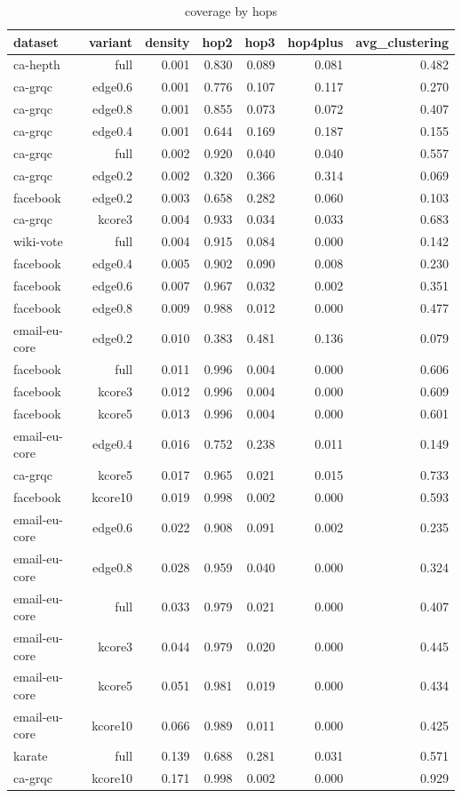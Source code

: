 \begin{table}[t]
\centering
\caption{coverage by hops}
\label{tab:coverage_by_hops}
\begin{tabular}{lrrrrrr}
\hline
dataset & variant & density & hop2 & hop3 & hop4plus & avg\_clustering \\
\hline
ca-hepth & full & 0.001 & 0.830 & 0.089 & 0.081 & 0.482 \\
ca-grqc & edge0.6 & 0.001 & 0.776 & 0.107 & 0.117 & 0.270 \\
ca-grqc & edge0.8 & 0.001 & 0.855 & 0.073 & 0.072 & 0.407 \\
ca-grqc & edge0.4 & 0.001 & 0.644 & 0.169 & 0.187 & 0.155 \\
ca-grqc & full & 0.002 & 0.920 & 0.040 & 0.040 & 0.557 \\
ca-grqc & edge0.2 & 0.002 & 0.320 & 0.366 & 0.314 & 0.069 \\
facebook & edge0.2 & 0.003 & 0.658 & 0.282 & 0.060 & 0.103 \\
ca-grqc & kcore3 & 0.004 & 0.933 & 0.034 & 0.033 & 0.683 \\
wiki-vote & full & 0.004 & 0.915 & 0.084 & 0.000 & 0.142 \\
facebook & edge0.4 & 0.005 & 0.902 & 0.090 & 0.008 & 0.230 \\
facebook & edge0.6 & 0.007 & 0.967 & 0.032 & 0.002 & 0.351 \\
facebook & edge0.8 & 0.009 & 0.988 & 0.012 & 0.000 & 0.477 \\
email-eu-core & edge0.2 & 0.010 & 0.383 & 0.481 & 0.136 & 0.079 \\
facebook & full & 0.011 & 0.996 & 0.004 & 0.000 & 0.606 \\
facebook & kcore3 & 0.012 & 0.996 & 0.004 & 0.000 & 0.609 \\
facebook & kcore5 & 0.013 & 0.996 & 0.004 & 0.000 & 0.601 \\
email-eu-core & edge0.4 & 0.016 & 0.752 & 0.238 & 0.011 & 0.149 \\
ca-grqc & kcore5 & 0.017 & 0.965 & 0.021 & 0.015 & 0.733 \\
facebook & kcore10 & 0.019 & 0.998 & 0.002 & 0.000 & 0.593 \\
email-eu-core & edge0.6 & 0.022 & 0.908 & 0.091 & 0.002 & 0.235 \\
email-eu-core & edge0.8 & 0.028 & 0.959 & 0.040 & 0.000 & 0.324 \\
email-eu-core & full & 0.033 & 0.979 & 0.021 & 0.000 & 0.407 \\
email-eu-core & kcore3 & 0.044 & 0.979 & 0.020 & 0.000 & 0.445 \\
email-eu-core & kcore5 & 0.051 & 0.981 & 0.019 & 0.000 & 0.434 \\
email-eu-core & kcore10 & 0.066 & 0.989 & 0.011 & 0.000 & 0.425 \\
karate & full & 0.139 & 0.688 & 0.281 & 0.031 & 0.571 \\
ca-grqc & kcore10 & 0.171 & 0.998 & 0.002 & 0.000 & 0.929 \\
\hline
\end{tabular}
\end{table}